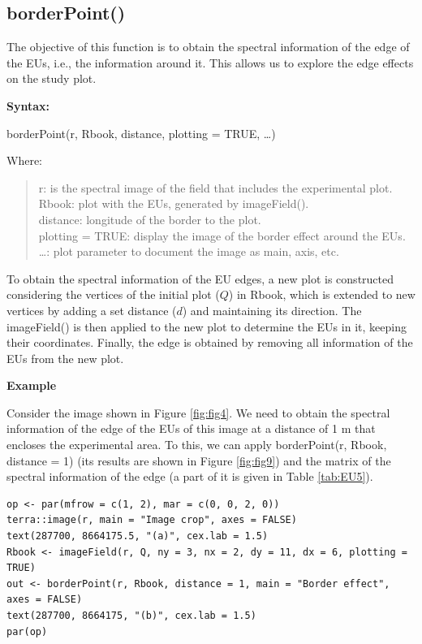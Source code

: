 \subsection{borderPoint()}\label{borderpoint}

The objective of this function is to obtain the spectral information of the edge of the EUs, i.e., the information around it. This allows us to explore the edge effects on the study plot.

\textbf{Syntax:}

borderPoint(r, Rbook, distance, plotting = TRUE, \ldots)

Where:

\begin{quote}
r: is the spectral image of the field that includes the experimental plot.\\
Rbook: plot with the EUs, generated by imageField().\\
distance: longitude of the border to the plot.\\
plotting = TRUE: display the image of the border effect around the EUs.\\
\ldots: plot parameter to document the image as main, axis, etc.
\end{quote}

To obtain the spectral information of the EU edges, a new plot is constructed considering the vertices of the initial plot (\(Q\)) in Rbook, which is extended to new vertices by adding a set distance (\(d\)) and maintaining its direction. The imageField() is then applied to the new plot to determine the EUs in it, keeping their coordinates. Finally, the edge is obtained by removing all information of the EUs from the new plot.

\textbf{Example}

Consider the image shown in Figure \ref{fig:fig4}. We need to obtain the spectral information of the edge of the EUs of this image at a distance of 1 m that encloses the experimental area. To this, we can apply borderPoint(r, Rbook, distance = 1) (its results are shown in Figure \ref{fig:fig9}) and the matrix of the spectral information of the edge (a part of it is given in Table \ref{tab:EU5}).

\begin{verbatim}
op <- par(mfrow = c(1, 2), mar = c(0, 0, 2, 0))
terra::image(r, main = "Image crop", axes = FALSE)
text(287700, 8664175.5, "(a)", cex.lab = 1.5)
Rbook <- imageField(r, Q, ny = 3, nx = 2, dy = 11, dx = 6, plotting = TRUE)
out <- borderPoint(r, Rbook, distance = 1, main = "Border effect", axes = FALSE)
text(287700, 8664175, "(b)", cex.lab = 1.5)
par(op)
\end{verbatim}

